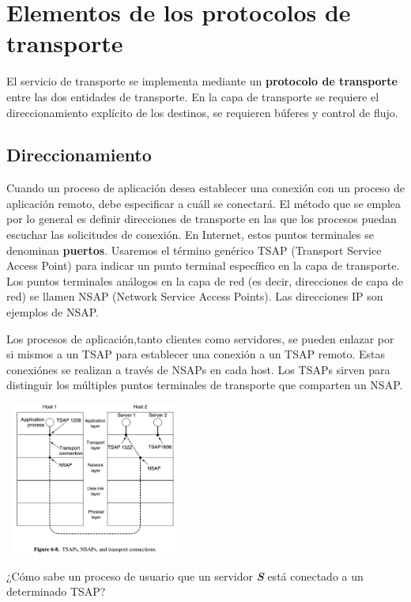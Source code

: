\documentclass[10pt,a4paper]{report}
\begin{document}
\section{Elementos de los protocolos de transporte}
	\par El servicio de transporte se implementa mediante un \textbf{protocolo de 
transporte} entre las dos entidades de transporte. En la capa de transporte se requiere 
el direccionamiento explícito de los destinos, se requieren búferes y control de flujo.

\subsection{Direccionamiento}
\par Cuando un proceso de aplicación desea establecer una conexión con un proceso 
de aplicación remoto, debe especificar a cuáll se conectará. El método que se emplea 
por lo general es definir direcciones de transporte en las que los procesos puedan 
escuchar las solicitudes de conexión. En Internet, estos puntos terminales se 
denominan \textbf{puertos}. Usaremos el término genérico TSAP (Transport Service 
Access Point) para indicar un punto terminal específico en la capa de transporte. Los 
puntos terminales análogos en la capa de red (es decir, direcciones de capa de red) se 
llamen NSAP (Network Service Access Points). Las direcciones IP son ejemplos de 
NSAP.
\par Los procesos de aplicación,tanto clientes como servidores, se pueden enlazar por 
si mismos a un TSAP para establecer una conexión a un TSAP remoto. Estas 
conexiónes se realizan a través de NSAPs en cada host. Los TSAPs sirven para 
distinguir los múltiples puntos terminales de transporte que comparten un NSAP.

\begin{center}
	\includegraphics[width=6cm, height=5cm]{./imagenes/tsap.png} 
\end{center}

\par ¿Cómo sabe un proceso de usuario que un servidor \textbf{\textit{S}} está 
conectado a un determinado TSAP?
\end{document}
